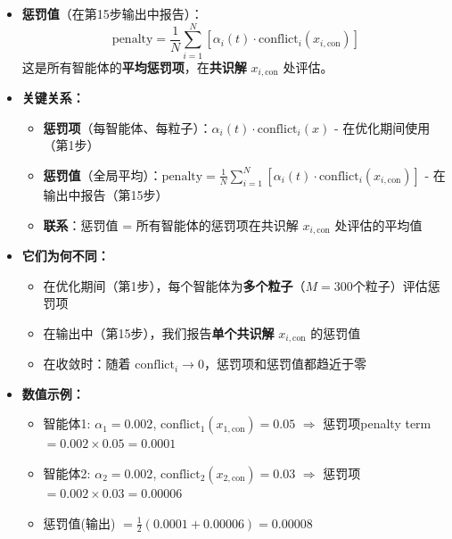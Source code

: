 \documentclass[11pt,a3paper]{ctexart}
\begin{document}
\begin{enumerate}
\begin{itemize}
        \item \textbf{惩罚值}（在第15步输出中报告）：
        \begin{equation}
        \text{penalty} = \frac{1}{N}\sum_{i=1}^N \left[\alpha_i(t) \cdot \text{conflict}_i(x_{i,\text{con}})\right]
        \end{equation}
        这是所有智能体的\textbf{平均惩罚项}，在\textbf{共识解} $x_{i,\text{con}}$ 处评估。
        
        \item \textbf{关键关系：}
        \begin{itemize}
            \item \textbf{惩罚项}（每智能体、每粒子）：$\alpha_i(t) \cdot \text{conflict}_i(x)$ - 在优化期间使用（第1步）
            \item \textbf{惩罚值}（全局平均）：$\text{penalty} = \frac{1}{N}\sum_{i=1}^N [\alpha_i(t) \cdot \text{conflict}_i(x_{i,\text{con}})]$ - 在输出中报告（第15步）
            \item \textbf{联系}：惩罚值 = 所有智能体的惩罚项在共识解 $x_{i,\text{con}}$ 处评估的平均值
        \end{itemize}
        
        \item \textbf{它们为何不同：}
        \begin{itemize}
            \item 在优化期间（第1步），每个智能体为\textbf{多个粒子}（$M=300$个粒子）评估惩罚项
            \item 在输出中（第15步），我们报告\textbf{单个共识解} $x_{i,\text{con}}$ 的惩罚值
            \item 在收敛时：随着 $\text{conflict}_i \to 0$，惩罚项和惩罚值都趋近于零
        \end{itemize}
        
        \item \textbf{数值示例：}
        \begin{itemize}
        \item 智能体1: $\alpha_1 = 0.002$, $\text{conflict}_1(x_{1,\text{con}}) = 0.05$ $\Rightarrow$ 惩罚项penalty term $= 0.002 \times 0.05 = 0.0001$
            \item 智能体2: $\alpha_2 = 0.002$, $\text{conflict}_2(x_{2,\text{con}}) = 0.03$ $\Rightarrow$ 惩罚项 $= 0.002 \times 0.03 = 0.00006$
            \item 惩罚值(输出) $= \frac{1}{2}(0.0001 + 0.00006) = 0.00008$
        \end{itemize}
    \end{itemize}
    

\end{enumerate}
\end{document}
